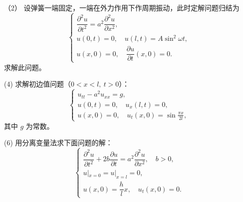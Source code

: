 \begin{exercise}（2）
设弹簧一端固定，一端在外力作用下作周期振动，此时定解问题归结为
\[
\begin{cases}
\dfrac{\partial^{2} u}{\partial t^{2}} 
= a^{2} \dfrac{\partial^{2} u}{\partial x^{2}}, \\[6pt]
u(0,t) = 0, \quad 
u(l,t) = A \sin^{2} \omega t, \\[6pt]
u(x,0) = 0, \quad 
\dfrac{\partial u}{\partial t}(x,0) = 0 .
\end{cases}
\]
求解此问题。
\end{exercise}
\begin{exercise}[分离变量法](4)
求解初边值问题（$0<x<l,\ t>0$）：
\[
\begin{cases}
u_{tt}-a^2u_{xx}=g,\\[2pt]
u(0,t)=0,\quad u_x(l,t)=0,\\[2pt]
u(x,0)=0,\quad u_t(x,0)=\displaystyle\sin\!\frac{\pi x}{2l},
\end{cases}
\]
其中 $g$ 为常数。
\end{exercise}
\begin{exercise}(6)
用分离变量法求下面问题的解：
\[
\begin{cases}
\dfrac{\partial^2 u}{\partial t^2} + 2b\dfrac{\partial u}{\partial t} = a^2 \dfrac{\partial^2 u}{\partial x^2}, \quad b>0, \\[6pt]
u|_{x=0} = u|_{x=l} = 0, \\[6pt]
u(x,0) = \dfrac{h}{l}x, \quad u_t(x,0) = 0.
\end{cases}
\]


\end{exercise}
